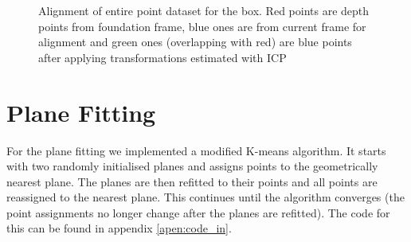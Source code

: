 \documentclass[12pt,a4paper,onecolumn]{article}
\begin{document}
\begin{figure}[h]	
    \centering
      \caption{Alignment of entire point dataset for the box. Red points are depth points from
      foundation frame, blue ones are from current frame for alignment and green ones (overlapping with red)
      are blue points after applying transformations estimated with ICP}
\end{figure}

\section{Plane Fitting}
For the plane fitting we implemented a modified K-means algorithm.  It starts with two randomly initialised planes and assigns points to the geometrically nearest plane.  The planes are then refitted to their points and all points are reassigned to the nearest plane.  This continues until the algorithm converges (the point assignments no longer change after the planes are refitted).  The code for this can be found in appendix \ref{apen:code_in}.
\end{document}
